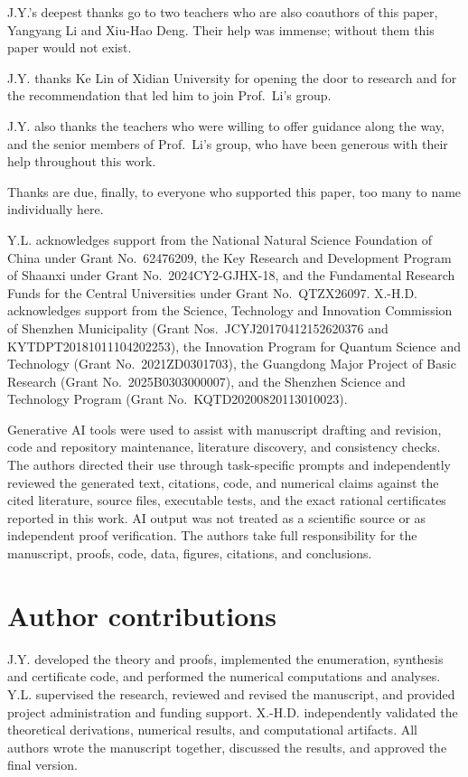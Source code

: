 \documentclass[aps,prx,twocolumn,superscriptaddress,nofootinbib,longbibliography]{revtex4-2}
\theoremstyle{plain}
\theoremstyle{definition}
\theoremstyle{remark}
\begin{document}
\begin{acknowledgments}
J.Y.'s deepest thanks go to two teachers who are also coauthors of this
paper, Yangyang Li and Xiu-Hao Deng. Their help was immense; without them
this paper would not exist.

J.Y. thanks Ke Lin of Xidian University for opening the door to research
and for the recommendation that led him to join Prof.~Li's group.

J.Y. also thanks the teachers who were willing to offer guidance along the
way, and the senior members of Prof.~Li's group, who have been generous
with their help throughout this work.

Thanks are due, finally, to everyone who supported this paper, too many to
name individually here.

Y.L. acknowledges support from the National Natural Science Foundation of
China under Grant No.~62476209, the Key Research and Development Program of
Shaanxi under Grant No.~2024CY2-GJHX-18, and the Fundamental Research Funds
for the Central Universities under Grant No.~QTZX26097. X.-H.D.
acknowledges support from the Science, Technology and Innovation Commission of Shenzhen
Municipality (Grant Nos.~JCYJ20170412152620376 and KYTDPT20181011104202253),
the Innovation Program for Quantum Science and Technology (Grant
No.~2021ZD0301703), the Guangdong Major Project of Basic Research (Grant
No.~2025B0303000007), and the Shenzhen Science and Technology Program
(Grant No.~KQTD20200820113010023).

Generative AI tools were used to assist with manuscript drafting and
revision, code and repository maintenance, literature discovery, and
consistency checks. The authors directed their use through task-specific
prompts and independently reviewed the generated text, citations, code, and
numerical claims against the cited literature, source files, executable tests,
and the exact rational certificates reported in this work. AI output was
not treated as a scientific source or as independent proof verification. The
authors take full responsibility for the manuscript, proofs, code, data,
figures, citations, and conclusions.
\end{acknowledgments}

\section*{Author contributions}
J.Y. developed the theory and proofs, implemented the enumeration, synthesis and certificate code, and performed
the numerical computations and analyses. Y.L. supervised the research, reviewed and revised the manuscript,
and provided project administration and funding support. X.-H.D.
independently validated the theoretical derivations, numerical results, and
computational artifacts. All authors wrote the manuscript together,
discussed the results, and approved the final version.
\end{document}
